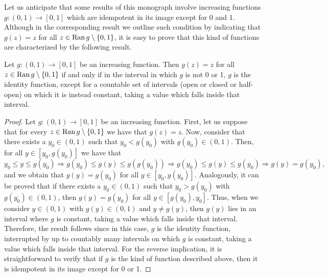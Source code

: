 Let us anticipate that some results of this monograph involve increasing functions $g:(0,1)\to [0,1]$ which are idempotent in its image except for 0 and 1. Although in the corresponding result we outline such condition by indicating that $g(z)=z$ for all $z \in \operatorname{Ran} g \setminus \{0,1\}$, it is easy to prove that this kind of functions are characterized by the following result.
\begin{lemma}\label{lem:idempotentfunctions} Let $g:(0,1) \to [0,1]$ be an increasing function. Then $g(z)=z$ for all $z \in \operatorname{Ran} g \setminus \{0,1\}$ if and only if in the interval in which $g$ is not 0 or 1, $g$ is the identity function, except for a countable set of intervals (open or closed or half-open) on which it is instead constant, taking a value which falls inside that interval.
\end{lemma}
\begin{proof}
	Let $g :(0,1) \to [0,1]$ be an increasing function. First, let us suppose that for every $z \in \operatorname{Ran} g \setminus \{0,1\}$ we have that $g(z)=z$. Now, consider that there exists a $y_0\in(0,1)$ such that $y_0<g(y_0)$ with $g(y_0)\in(0,1)$. Then, for all $y\in[y_0,g(y_0)]$ we have that
	$$y_0 \leq y \leq g(y_0) \Rightarrow g(y_0) \leq g(y) \leq g(g(y_0)) \Rightarrow g(y_0) \leq g(y) \leq  g(y_0) \Rightarrow g(y)=g(y_0),$$
	and we obtain that $g(y)=g(y_0)$ for all $y \in [y_0,g(y_0)]$. Analogously, it can be proved that if there exists a $y_0\in(0,1)$ such that $y_0>g(y_0)$ with $g(y_0)\in(0,1)$, then $g(y)=g(y_0)$ for all $y\in[g(y_0),y_0]$.  Thus, when we consider $y \in (0,1)$ with $g(y) \in (0,1)$ and $y \not = g(y)$, then $g(y)$ lies in an interval where $g$ is constant, taking a value which falls inside that interval. Therefore, the result follows since in this case, $g$ is the identity function, interrupted by up to countably many intervals on which $g$ is constant, taking a value which falls inside that interval.  For the reverse implication, it is straightforward to verify that if $g$ is the kind of function described above, then it is idempotent in its image except for 0 or 1.
\end{proof}
